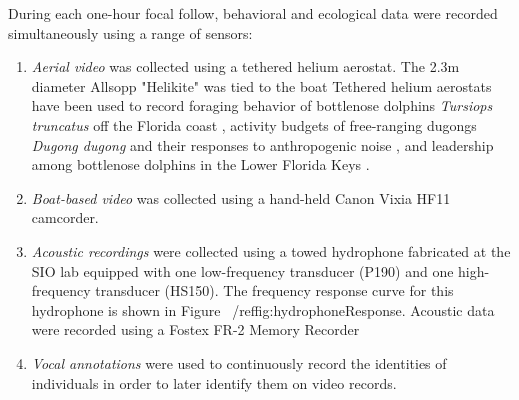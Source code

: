 \documentclass[11pt]{amsart}
\begin{document}
During each one-hour focal follow, behavioral and ecological data were recorded simultaneously using a range of sensors: 
\begin{enumerate}[label*=\arabic*.]

\item \emph{Aerial video} was collected using a tethered helium aerostat. The 2.3m diameter Allsopp "Helikite" was tied to the boat
Tethered helium aerostats have been used to record foraging behavior of bottlenose dolphins \emph{Tursiops truncatus} off the Florida coast \citep{nowacek:2002}, activity budgets of free-ranging dugongs \emph{Dugong dugong} %
and their responses to anthropogenic noise \citep{hodgson:2004}, and leadership among bottlenose dolphins in the Lower Florida Keys \citep{lewis:2011}. 

\item \emph{Boat-based video} was collected using a hand-held Canon Vixia HF11 camcorder. 

\item \emph{Acoustic recordings} were collected using a towed hydrophone fabricated at the SIO lab %
equipped with one low-frequency transducer (P190) and one high-frequency transducer (HS150). The frequency response curve for this hydrophone is shown in Figure ~/ref{fig:hydrophoneResponse}. Acoustic data were recorded using a Fostex FR-2 Memory Recorder %

\item \emph{Vocal annotations} were used to continuously record the identities of individuals in order to later identify them on video records. 


\end{enumerate}
\end{document}
